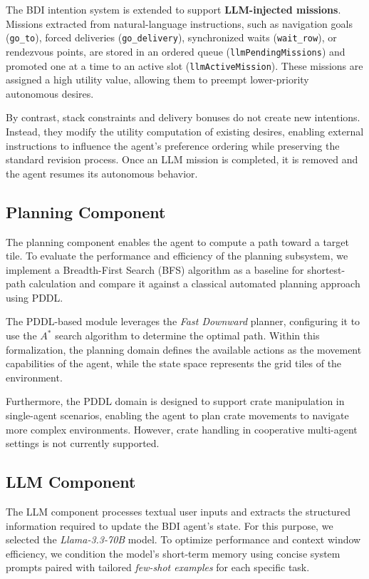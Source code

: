 The BDI intention system is extended to support \textbf{LLM-injected missions}. Missions extracted from natural-language instructions, such as navigation goals (\texttt{go\_to}), forced deliveries (\texttt{go\_delivery}), synchronized waits (\texttt{wait\_row}), or rendezvous points, are stored in an ordered queue (\texttt{llmPendingMissions}) and promoted one at a time to an active slot (\texttt{llmActiveMission}). These missions are assigned a high utility value, allowing them to preempt lower-priority autonomous desires.

By contrast, stack constraints and delivery bonuses do not create new intentions. Instead, they modify the utility computation of existing desires, enabling external instructions to influence the agent's preference ordering while preserving the standard revision process. Once an LLM mission is completed, it is removed and the agent resumes its autonomous behavior.

\subsection{Planning Component}
The planning component enables the agent to compute a path toward a target tile. To evaluate the performance and efficiency of the planning subsystem, we implement a Breadth-First Search (BFS) algorithm as a baseline for shortest-path calculation and compare it against a classical automated planning approach using PDDL. 

The PDDL-based module leverages the \textit{Fast Downward} planner, configuring it to use the $A^*$ search algorithm to determine the optimal path. Within this formalization, the planning domain defines the available actions as the movement capabilities of the agent, while the state space represents the grid tiles of the environment. 

Furthermore, the PDDL domain is designed to support crate manipulation in single-agent scenarios, enabling the agent to plan crate movements to navigate more complex environments. However, crate handling in cooperative multi-agent settings is not currently supported.


\subsection{LLM Component}\label{sec:llm}

The LLM component processes textual user inputs and extracts the structured information required to update the BDI agent's state. For this purpose, we selected the \textit{Llama-3.3-70B} model. To optimize performance and context window efficiency, we condition the model's short-term memory using concise system prompts paired with tailored \textit{few-shot examples} for each specific task.

